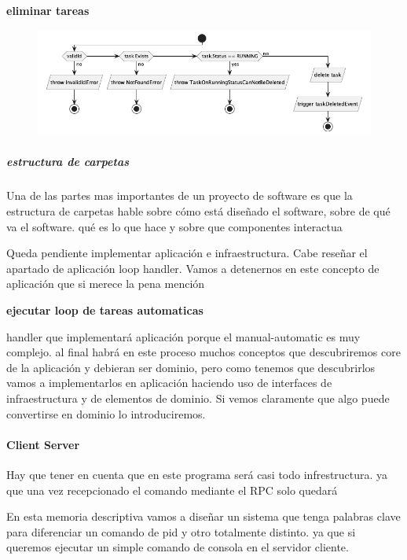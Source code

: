 \textbf{eliminar tareas}

\begin{figure}[H]
    \centering
    \includegraphics[height=0.2\textheight]{part/memoria_descriptiva/deleteTaskUseCase}
    \caption[Diagrama de objetos de dominio]{}\label{fig:deleteTaskUseCase}
\end{figure}

\subparagraph{estructura de carpetas}

Una de las partes mas importantes de un proyecto de software es que la estructura de carpetas hable sobre cómo está diseñado el software, sobre de qué va el software. qué es lo que hace y sobre que componentes interactua



Queda pendiente implementar aplicación e infraestructura. Cabe reseñar el apartado de aplicación loop handler. Vamos a detenernos en este concepto de aplicación que si merece la pena mención

\textbf{ejecutar loop de tareas automaticas}

handler que implementará aplicación porque el manual-automatic es muy complejo. al final habrá en este proceso muchos conceptos que descubriremos core de la aplicación y debieran ser dominio, pero como tenemos que descubrirlos vamos a implementarlos en aplicación haciendo uso de interfaces de infraestructura y de elementos de dominio. Si vemos claramente que algo puede convertirse en dominio lo introduciremos.


\paragraph{Client Server}

Hay que tener en cuenta que en este programa será casi todo infrestructura. ya que una vez recepcionado el comando mediante el RPC
solo quedará

En esta memoria descriptiva vamos a diseñar un sistema que tenga palabras clave para diferenciar un comando de pid y otro totalmente distinto. ya que si queremos ejecutar un simple comando de consola en el servidor cliente.

